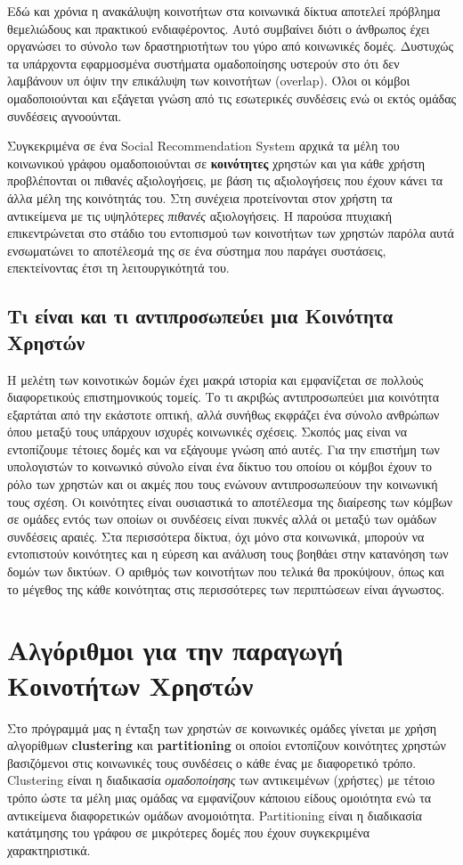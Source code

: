 Εδώ και χρόνια η ανακάλυψη κοινοτήτων στα κοινωνικά δίκτυα αποτελεί πρόβλημα θεμελιώδους και πρακτικού ενδιαφέροντος. 
Αυτό συμβαίνει διότι ο άνθρωπος έχει οργανώσει το σύνολο των δραστηριοτήτων του γύρο από κοινωνικές δομές. 
Δυστυχώς τα υπάρχοντα εφαρμοσμένα συστήματα ομαδοποίησης υστερούν στο ότι δεν λαμβάνουν υπ όψιν την επικάλυψη των κοινοτήτων (overlap).
Όλοι οι κόμβοι ομαδοποιούνται και εξάγεται γνώση από τις εσωτερικές συνδέσεις ενώ οι εκτός ομάδας συνδέσεις αγνοούνται. \cite{ClusteringSocialNetworks}

Συγκεκριμένα σε ένα Social Recommendation System αρχικά τα μέλη του κοινωνικού γράφου ομαδοποιούνται σε \textbf{κοινότητες} χρηστών 
και για κάθε χρήστη προβλέπονται οι πιθανές αξιολογήσεις, 
με βάση τις αξιολογήσεις που έχουν κάνει τα άλλα μέλη της κοινότητάς του.
Στη συνέχεια προτείνονται στον χρήστη τα αντικείμενα με τις υψηλότερες \emph{πιθανές} αξιολογήσεις.
Η παρούσα πτυχιακή επικεντρώνεται στο στάδιο του εντοπισμού των κοινοτήτων των χρηστών 
παρόλα αυτά ενσωματώνει το αποτέλεσμά της σε ένα σύστημα που παράγει συστάσεις, επεκτείνοντας έτσι τη λειτουργικότητά του.

\subsection{Τι είναι και τι αντιπροσωπεύει μια Κοινότητα Χρηστών}
\noindent
Η μελέτη των κοινοτικών δομών έχει μακρά ιστορία και εμφανίζεται σε πολλούς διαφορετικούς επιστημονικούς τομείς. 
Το τι ακριβώς αντιπροσωπεύει μια κοινότητα εξαρτάται από την εκάστοτε οπτική, αλλά συνήθως εκφράζει ένα σύνολο ανθρώπων όπου μεταξύ τους υπάρχουν ισχυρές κοινωνικές σχέσεις. 
Σκοπός μας είναι να εντοπίζουμε τέτοιες δομές και να εξάγουμε γνώση από αυτές. 
Για την επιστήμη των υπολογιστών το κοινωνικό σύνολο είναι ένα δίκτυο του οποίου οι κόμβοι έχουν το ρόλο των χρηστών
και οι ακμές που τους ενώνουν αντιπροσωπεύουν την κοινωνική τους σχέση.
Οι κοινότητες είναι ουσιαστικά το αποτέλεσμα της διαίρεσης των κόμβων σε ομάδες εντός 
των οποίων οι συνδέσεις είναι πυκνές αλλά οι μεταξύ των ομάδων συνδέσεις αραιές. 
Στα περισσότερα δίκτυα, όχι μόνο στα κοινωνικά, μπορούν να εντοπιστούν κοινότητες και
η εύρεση και ανάλυση τους βοηθάει στην κατανόηση των δομών των δικτύων. 
Ο αριθμός των κοινοτήτων που τελικά θα προκύψουν, όπως και το μέγεθος της κάθε κοινότητας στις περισσότερες των περιπτώσεων είναι άγνωστος. 
\cite{PhysRevE.69.026113}

\section{Αλγόριθμοι για την παραγωγή Κοινοτήτων Χρηστών}
\label{Αλγόριθμοι}
\noindent
Στο πρόγραμμά μας η ένταξη των χρηστών σε κοινωνικές ομάδες γίνεται με χρήση αλγορίθμων \textbf{clustering} και \textbf{partitioning}
οι οποίοι εντοπίζουν κοινότητες χρηστών βασιζόμενοι στις κοινωνικές τους συνδέσεις ο κάθε ένας με διαφορετικό τρόπο. 
Clustering είναι η διαδικασία \emph{ομαδοποίησης} των αντικειμένων (χρήστες) με τέτοιο τρόπο 
ώστε τα μέλη μιας ομάδας να εμφανίζουν κάποιου είδους ομοιότητα ενώ τα αντικείμενα διαφορετικών ομάδων ανομοιότητα. 
Partitioning είναι η διαδικασία κατάτμησης του γράφου σε μικρότερες δομές που έχουν συγκεκριμένα χαρακτηριστικά.  

